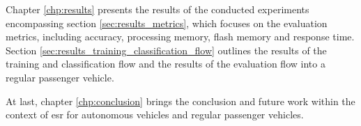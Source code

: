 Chapter \ref{chp:results} presents the results of the conducted experiments encompassing section \ref{sec:results_metrics}, which focuses on the evaluation metrics, including accuracy, processing memory, flash memory and response time. Section \ref{sec:results_training_classification_flow} outlines the results of the training and classification flow and the results of the evaluation flow into a regular passenger vehicle.

At last, chapter \ref{chp:conclusion} brings the conclusion and future work within the context of \gls{esr} for autonomous vehicles and regular passenger vehicles.


